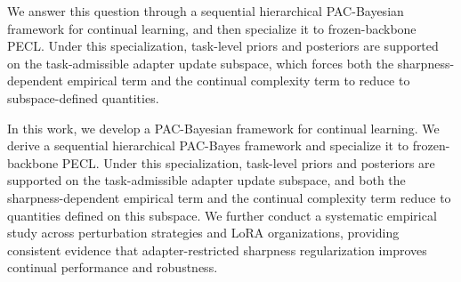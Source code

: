 \documentclass{article}
\theoremstyle{plain}
\theoremstyle{definition}
\theoremstyle{remark}
\begin{document}
We answer this question through a sequential hierarchical PAC-Bayesian framework for continual learning, and then specialize it to frozen-backbone PECL. Under this specialization, task-level priors and posteriors are supported on the task-admissible adapter update subspace, which forces both the sharpness-dependent empirical term and the continual complexity term to reduce to subspace-defined quantities.


In this work, we develop a PAC-Bayesian framework for continual learning. We derive a sequential hierarchical PAC-Bayes framework and specialize it to frozen-backbone PECL.
Under this specialization, task-level priors and posteriors are supported on the task-admissible adapter update subspace, and both the sharpness-dependent empirical term and the continual complexity term reduce to quantities defined on this subspace.
We further conduct a systematic empirical study across perturbation strategies and LoRA organizations, providing consistent evidence that adapter-restricted sharpness regularization improves continual performance and robustness.



\end{document}
